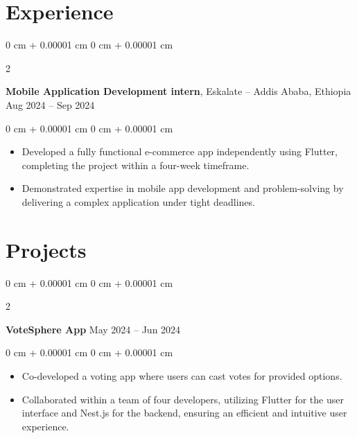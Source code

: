 \documentclass[10pt, letterpaper]{article}
\newenvironment{highlights}{
    \begin{itemize}[
        topsep=0.10 cm,
        parsep=0.10 cm,
        partopsep=0pt,
        itemsep=0pt,
        leftmargin=0 cm + 10pt
    ]
}{
    \end{itemize}
} %
\newenvironment{onecolentry}{
    \begin{adjustwidth}{
        0 cm + 0.00001 cm
    }{
        0 cm + 0.00001 cm
    }
}{
    \end{adjustwidth}
} %
\newenvironment{twocolentry}[2][]{
    \onecolentry
    \def\secondColumn{#2}
    \setcolumnwidth{\fill, 4.5 cm}
    \begin{paracol}{2}
}{
    \switchcolumn \raggedleft \secondColumn
    \end{paracol}
    \endonecolentry
} %
\begin{document}
    \section{Experience}

        \begin{twocolentry}{
            Aug 2024 – Sep 2024
        }
            \textbf{Mobile Application Development intern}, Eskalate -- Addis Ababa, Ethiopia\end{twocolentry}

        \vspace{0.10 cm}
        \begin{onecolentry}
            \begin{highlights}
            \item Developed a fully functional e-commerce app independently using Flutter, \\completing the project within a four-week timeframe.
            \item Demonstrated expertise in mobile app development and problem-solving by \\delivering a complex application under tight deadlines.
            \end{highlights}
        \end{onecolentry}

    \section{Projects}

        \begin{twocolentry}{
            May 2024 – Jun 2024
        }
            \textbf{VoteSphere App}\end{twocolentry}

        \vspace{0.10 cm}
        \begin{onecolentry}
            \begin{highlights}
                \item Co-developed a voting app where users can cast votes for provided options.
                \item Collaborated within a team of four developers, utilizing Flutter for the user \\interface and Nest.js for the backend, ensuring an efficient and intuitive user \\experience.
            \end{highlights}
        \end{onecolentry}
\end{document}
